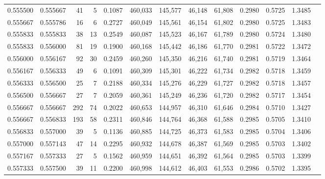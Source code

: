 \begin{tabular}{rrrrrrrrrrrrr}
0.555500 & 0.555667 &    41 &   5 &                                     0.1087 & 460,033 & 145,577 &  46,148 &  61,808 & 0.2980 & 0.5725 & 1.3485 \\
0.555667 & 0.555786 &    16 &   6 &                                     0.2727 & 460,049 & 145,561 &  46,154 &  61,802 & 0.2980 & 0.5725 & 1.3483 \\
0.555833 & 0.555833 &    38 &  13 &                                     0.2549 & 460,087 & 145,523 &  46,167 &  61,789 & 0.2980 & 0.5724 & 1.3480 \\
0.555833 & 0.556000 &    81 &  19 &                                     0.1900 & 460,168 & 145,442 &  46,186 &  61,770 & 0.2981 & 0.5722 & 1.3472 \\
0.556000 & 0.556167 &    92 &  30 &                                     0.2459 & 460,260 & 145,350 &  46,216 &  61,740 & 0.2981 & 0.5719 & 1.3464 \\
0.556167 & 0.556333 &    49 &   6 &                                     0.1091 & 460,309 & 145,301 &  46,222 &  61,734 & 0.2982 & 0.5718 & 1.3459 \\
0.556333 & 0.556500 &    25 &   7 &                                     0.2188 & 460,334 & 145,276 &  46,229 &  61,727 & 0.2982 & 0.5718 & 1.3457 \\
0.556500 & 0.556667 &    27 &   7 &                                     0.2059 & 460,361 & 145,249 &  46,236 &  61,720 & 0.2982 & 0.5717 & 1.3454 \\
0.556667 & 0.556667 &   292 &  74 &                                     0.2022 & 460,653 & 144,957 &  46,310 &  61,646 & 0.2984 & 0.5710 & 1.3427 \\
0.556667 & 0.556833 &   193 &  58 &                                     0.2311 & 460,846 & 144,764 &  46,368 &  61,588 & 0.2985 & 0.5705 & 1.3410 \\
0.556833 & 0.557000 &    39 &   5 &                                     0.1136 & 460,885 & 144,725 &  46,373 &  61,583 & 0.2985 & 0.5704 & 1.3406 \\
0.557000 & 0.557143 &    47 &  14 &                                     0.2295 & 460,932 & 144,678 &  46,387 &  61,569 & 0.2985 & 0.5703 & 1.3402 \\
0.557167 & 0.557333 &    27 &   5 &                                     0.1562 & 460,959 & 144,651 &  46,392 &  61,564 & 0.2985 & 0.5703 & 1.3399 \\
0.557333 & 0.557500 &    39 &  11 &                                     0.2200 & 460,998 & 144,612 &  46,403 &  61,553 & 0.2986 & 0.5702 & 1.3395 \\

\end{tabular}

